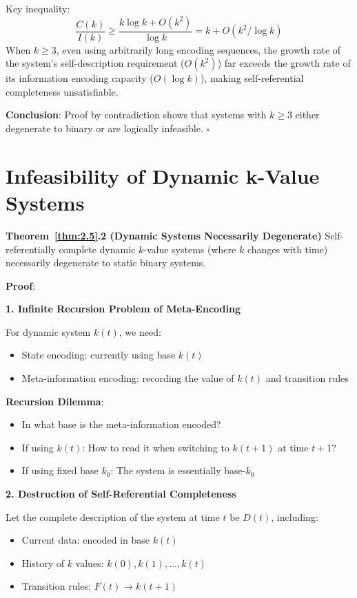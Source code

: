 Key inequality:
\begin{equation}
\frac{C(k)}{I(k)} \geq \frac{k \log k + O(k^2)}{\log k} = k + O(k^2/\log k)
\end{equation}
When $k \geq 3$, even using arbitrarily long encoding sequences, the growth rate of the system's self-description requirement ($O(k^2)$) far exceeds the growth rate of its information encoding capacity ($O(\log k)$), making self-referential completeness unsatisfiable.

\textbf{Conclusion}: Proof by contradiction shows that systems with $k \geq 3$ either degenerate to binary or are logically infeasible. $\square$

\section{Infeasibility of Dynamic k-Value Systems}
\label{sec:ch04_encoding:infeasibility-of-dynamic-k-value-systems}

\textbf{Theorem~\ref{thm:2.5}.2 (Dynamic Systems Necessarily Degenerate)}
\label{thm:2.5}
Self-referentially complete dynamic $k$-value systems (where $k$ changes with time) necessarily degenerate to static binary systems.

\textbf{Proof}:

\textbf{1. Infinite Recursion Problem of Meta-Encoding}

For dynamic system $k(t)$, we need:
\begin{itemize}
\item State encoding: currently using base $k(t)$
\item Meta-information encoding: recording the value of $k(t)$ and transition rules
\end{itemize}

\textbf{Recursion Dilemma}:
\begin{itemize}
\item In what base is the meta-information encoded?
\item If using $k(t)$: How to read it when switching to $k(t+1)$ at time $t+1$?
\item If using fixed base $k_0$: The system is essentially base-$k_0$
\end{itemize}

\textbf{2. Destruction of Self-Referential Completeness}

Let the complete description of the system at time $t$ be $D(t)$, including:
\begin{itemize}
\item Current data: encoded in base $k(t)$
\item History of $k$ values: ${k(0), k(1), ..., k(t)}$
\item Transition rules: $F(t) \to k(t+1)$
\end{itemize}


